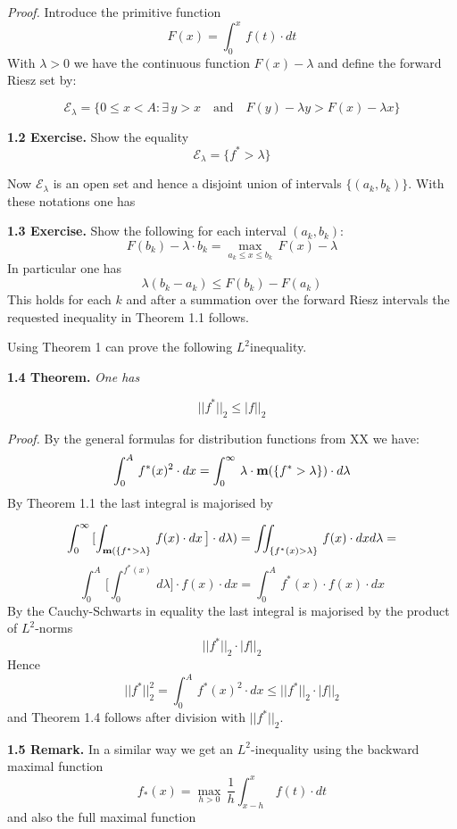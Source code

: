 \noindent
\emph{Proof.}
Introduce the primitive function
\[ 
F(x)=\int_0^x\, f(t)\cdot dt
\]
With $\lambda>0$ we have the continuous function $F(x)-\lambda$
and define the forward Riesz set by:

\[
\mathcal E_\lambda=\{0\leq  x<A\colon\exists \, y>x\quad
\text{and}\quad F(y)-\lambda y> F(x)-\lambda x\}
\]

\noindent
{\bf{1.2 Exercise.}}
Show  the equality
\[
\mathcal E_\lambda=\{ f^*>\lambda\}
\]

\noindent
Now $\mathcal E_\lambda$ is an open  set and hence 
a disjoint union of intervals $\{(a_k,b_k)\}$.
With these notations one has
\medskip

\noindent
{\bf{1.3 Exercise.}}
Show the following for each interval $(a_k,b_k)$:
\[
F(b_k)-\lambda\cdot b_k=\max_{a_k\leq x\leq b_k}\, F(x)-\lambda
\]
In particular one has
\[
\lambda(b_k-a_k)\leq F(b_k)-F(a_k)
\]
This holds for each $k$ and after a summation over the 
forward Riesz intervals the requested inequality in
Theorem 1.1 follows.
\bigskip

\noindent
Using Theorem 1 can prove the following $L^2$\vvv inequality.

\medskip

\noindent
{\bf{1.4 Theorem.}}
\emph{One has}

\[
||f^*||_2\leq  |f||_2
\]

\noindent
\emph{Proof.} By the general formulas for distribution functions 
from XX we have:
\[
\int_0^A\, f^*(x)^2\cdot dx=
\int_0^\infty\,
\lambda\cdot {\bf{m}}(\{f^*>\lambda\})\cdot d\lambda
\]
By Theorem 1.1 the last integral is majorised by

\[
\int_0^\infty\,[\int_
{{\bf{m}}(\{f^*>\lambda\}}\, f(x)\cdot dx\,\bigr]\cdot d\lambda)=
\iint_{\{f^*(x)>\lambda\}}\,f(x)\cdot dxd\lambda=
\]
\[
\int_0^A\, \bigl[\int_0^{f^*(x)}\, d\lambda\bigr]\cdot f(x)\cdot dx
=\int_0^A\, f^*(x)\cdot f(x)\cdot dx
\]
By the Cauchy-Schwarts in equality the last integral is majorised
by the product of $L^2$-norms
\[
||f^*||_2\cdot |f||_2
\]
Hence
\[
||f^*||_2^2=
\int_0^A\, f^*(x)^2\cdot dx\leq ||f^*||_2\cdot |f||_2
\] 
and Theorem 1.4 follows after
division with $||f^*||_2$.

\medskip



\noindent
{\bf{1.5 Remark.}}
In a similar way we get an $L^2$-inequality using the 
backward maximal  function
\[
 f_*(x)=\max_{h>0}\, \frac{1}{h}\int_{x-h}^x\, f(t)\cdot dt
\]
and also the
full maximal function


